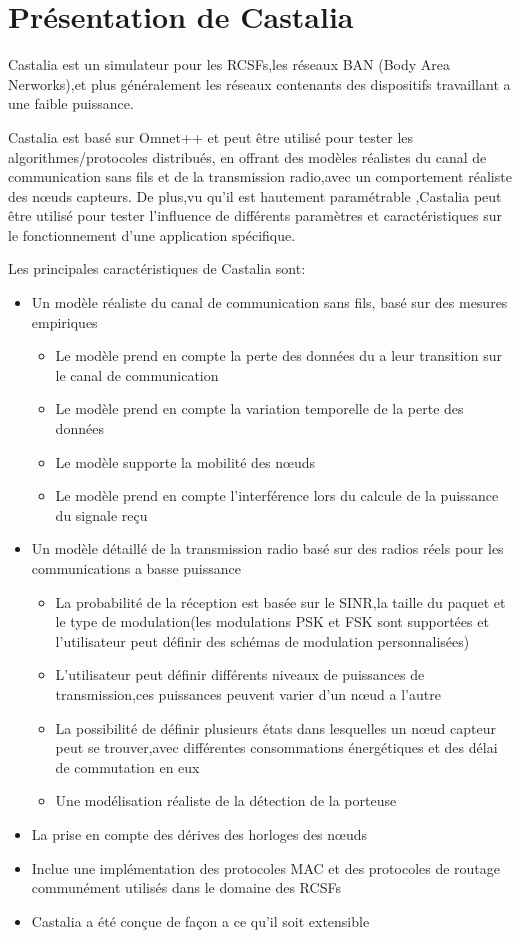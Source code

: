\section{Présentation de Castalia}
Castalia est un simulateur pour les RCSFs,les réseaux BAN (Body Area Nerworks),et plus généralement les réseaux contenants des dispositifs travaillant a une faible puissance.

Castalia est basé sur Omnet++ et peut être utilisé pour tester les algorithmes/protocoles  distribués, en offrant des modèles réalistes du canal de communication sans fils et de la transmission radio,avec un comportement réaliste des nœuds capteurs.
De plus,vu qu'il est hautement paramétrable ,Castalia peut être utilisé pour tester l'influence de différents paramètres et caractéristiques sur le fonctionnement d'une application spécifique. 

Les principales caractéristiques de Castalia sont:

\begin{itemize}
\item Un modèle réaliste du canal de communication sans fils, basé sur des mesures empiriques
 	\begin{itemize}
 	\item Le modèle prend en compte la perte des 		   		  données du a leur transition sur le canal de			  communication
	\item Le modèle prend en compte la variation 				  temporelle de la perte des données
	\item Le modèle supporte la mobilité des nœuds
	\item Le modèle prend en compte l'interférence lors 		  du calcule de la puissance du signale reçu   
 	\end{itemize}
\item Un modèle détaillé de la transmission  radio basé sur des radios réels pour les communications a basse puissance
	\begin{itemize}
		
	\item La probabilité de la réception est basée sur le SINR,la taille du paquet et le type de modulation(les modulations PSK et FSK sont supportées et l'utilisateur peut définir des schémas de modulation personnalisées)
	\item L'utilisateur peut définir différents niveaux de puissances de transmission,ces puissances peuvent varier d'un nœud a l'autre
	\item La possibilité de définir plusieurs états dans lesquelles un nœud capteur peut se trouver,avec différentes consommations énergétiques et des délai de commutation en eux
	\item Une modélisation réaliste de la détection de la porteuse  
	\end{itemize}
\item La prise en compte des dérives des horloges des nœuds
\item Inclue une implémentation des protocoles MAC et des protocoles de routage communément utilisés dans le domaine des RCSFs
\item Castalia a été conçue de façon a ce qu'il soit extensible
\end{itemize}

